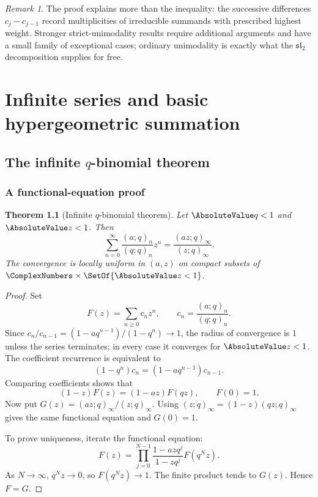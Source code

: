 \documentclass[11pt,a4paper,oneside,openany]{book}
\newtheorem{theorem}{Theorem}[chapter]
\theoremstyle{definition}
\theoremstyle{remark}
\newtheorem{remark}[remark]{Remark}
\begin{document}
\begin{remark}
The proof explains more than the inequality: the successive differences $c_j-c_{j-1}$ record multiplicities of irreducible summands with prescribed highest weight.  Stronger strict-unimodality results require additional arguments and have a small family of exceptional cases; ordinary unimodality is exactly what the $\mathfrak{sl}_2$ decomposition supplies for free.
\end{remark}


\part{Infinite series and basic hypergeometric summation}

\chapter{The infinite \texorpdfstring{$q$}{q}-binomial theorem}\label{chap:infinite-qbinomial}

\section{A functional-equation proof}

\begin{theorem}[Infinite $q$-binomial theorem]\label{thm:infinite-qbinomial}
Let $\AbsoluteValue q<1$ and $\AbsoluteValue z<1$.  Then
\[
 \sum_{n=0}^{\infty}\frac{(a;q)_n}{(q;q)_n}z^n
 =\frac{(az;q)_\infty}{(z;q)_\infty}.
\]
The convergence is locally uniform in $(a,z)$ on compact subsets of $\ComplexNumbers\times\SetOf{\AbsoluteValue z<1}$.
\end{theorem}

\begin{proof}
Set
\[
 F(z)=\sum_{n\ge0}c_nz^n,
 \qquad c_n=\frac{(a;q)_n}{(q;q)_n}.
\]
Since $c_{n}/c_{n-1}=(1-aq^{n-1})/(1-q^n)\to1$, the radius of convergence is $1$ unless the series terminates; in every case it converges for $\AbsoluteValue z<1$.  The coefficient recurrence is equivalent to
\[
 (1-q^n)c_n=(1-aq^{n-1})c_{n-1}.
\]
Comparing coefficients shows that
\[
 (1-z)F(z)=(1-az)F(qz),\qquad F(0)=1.\label{eq:qbinom-fe}
\]
Now put
\(
 G(z)=(az;q)_\infty/(z;q)_\infty.
\)
Using $(z;q)_\infty=(1-z)(qz;q)_\infty$ gives the same functional equation and $G(0)=1$.

To prove uniqueness, iterate the functional equation:
\[
 F(z)=\prod_{j=0}^{N-1}\frac{1-azq^j}{1-zq^j}F(q^Nz).
\]
As $N\to\infty$, $q^Nz\to0$, so $F(q^Nz)\to1$.  The finite product tends to $G(z)$.  Hence $F=G$.
\end{proof}
\end{document}
